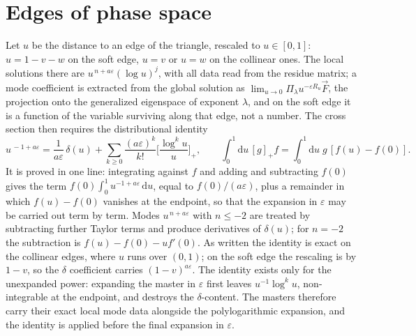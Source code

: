 \documentclass[11pt]{article}
\newcommand{\eps}{\varepsilon}
\newcommand{\dd}{\mathrm{d}}
\begin{document}
\section{Edges of phase space}
Let $u$ be the distance to an edge of the triangle, rescaled to
$u\in[0,1]$: $u = 1-v-w$ on the soft edge, $u = v$ or $u = w$ on the
collinear ones.  The local solutions there are $u^{\,n+a\eps}(\log
u)^j$, with all data read from the residue matrix; a mode coefficient
is extracted from the global solution as
$\lim_{u\to0}\Pi_\lambda u^{-\eps R_u}\vec F$, the projection onto
the generalized eigenspace of exponent $\lambda$, and on the soft
edge it is a function of the variable surviving along that edge, not
a number.  The cross section then requires the distributional
identity
\begin{equation}
  u^{\,-1+a\eps} = \frac{1}{a\eps}\,\delta(u)
  + \sum_{k\ge0}\frac{(a\eps)^k}{k!}
  \Big[\frac{\log^k u}{u}\Big]_+ ,
  \qquad
  \int_0^1\!\dd u\,[g]_+f = \int_0^1\!\dd u\;g\,[f(u)-f(0)] .
\end{equation}
It is proved in one line: integrating against $f$ and adding and
subtracting $f(0)$ gives the term
$f(0)\int_0^1 u^{-1+a\eps}\,\dd u$, equal to $f(0)/(a\eps)$, plus a
remainder in
which $f(u)-f(0)$ vanishes at the endpoint, so that the expansion in
$\eps$ may be carried out term by term.  Modes $u^{\,n+a\eps}$ with
$n\le-2$ are treated by subtracting further Taylor terms and produce
derivatives of $\delta(u)$; for $n=-2$ the subtraction is
$f(u)-f(0)-u f'(0)$.  As written the identity is exact on the
collinear edges, where $u$ runs over $(0,1)$; on the soft edge the
rescaling is by $1-v$, so the $\delta$ coefficient carries
$(1-v)^{a\eps}$.  The identity exists only for the unexpanded
power: expanding the master in $\eps$ first leaves $u^{-1}\log^k u$,
non-integrable at the endpoint, and destroys the $\delta$-content.
The masters therefore carry their exact local mode data alongside the
polylogarithmic expansion, and the identity is applied before the
final expansion in $\eps$.
\end{document}

